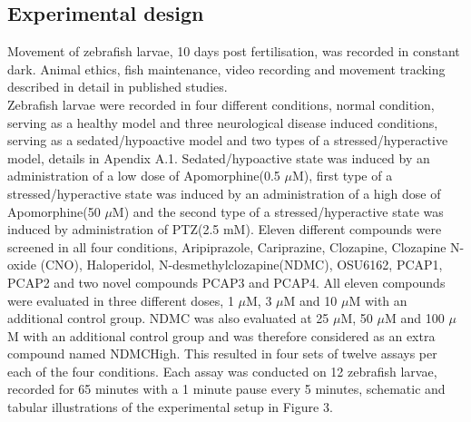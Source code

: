 \documentclass[a4paper,12pt]{article}
\begin{document}
\subsection{Experimental design}
Movement of zebrafish larvae, 10 days post fertilisation, was recorded in constant dark. Animal ethics, fish maintenance, video recording and movement tracking described in detail in published studies\cite{ref17}\cite{ref18}. \\Zebrafish larvae were recorded in four different conditions, normal condition, serving as a healthy model and three neurological disease induced conditions, serving as a sedated/hypoactive model and two types of a stressed/hyperactive model, details in Apendix A.1. Sedated/hypoactive state was induced by an administration of a low dose of Apomorphine(0.5 $\mu$M), first type of a stressed/hyperactive state was induced by an administration of a high dose of Apomorphine(50 $\mu$M) and the second type of a stressed/hyperactive state was induced by administration of PTZ(2.5 mM). Eleven different compounds were screened in all four conditions, Aripiprazole\cite{ref27}, Cariprazine\cite{ref28}, Clozapine\cite{ref29}, Clozapine N-oxide (CNO)\cite{ref30}, Haloperidol\cite{ref31}, N-desmethylclozapine(NDMC)\cite{ref32}, OSU6162\cite{ref33}, PCAP1\cite{ref34}, PCAP2\cite{ref34} and two novel compounds PCAP3 and PCAP4. All eleven compounds were evaluated in three different doses, 1 $\mu$M, 3 $\mu$M and 10 $\mu$M  with an additional control group. NDMC was also evaluated at 25 $\mu$M, 50 $\mu$M and 100 $\mu$M with an additional control group and was therefore considered as an extra compound named NDMCHigh. This resulted in four sets of twelve assays per each of the four conditions.
Each assay was conducted on 12 zebrafish larvae, recorded for 65 minutes with a 1 minute pause every 5 minutes, schematic and tabular illustrations of the experimental setup in Figure 3.
\end{document}
